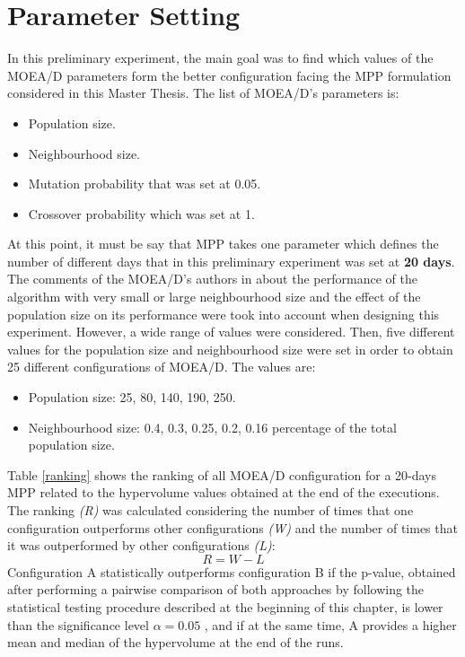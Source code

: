 \section{Parameter Setting}
In this preliminary experiment, the main goal was to find which values of the MOEA/D\cite{Zhang2007} parameters form the better configuration facing the MPP formulation considered in this Master Thesis. The list of MOEA/D's parameters is:
\begin{itemize}
    \item Population size.
    \item Neighbourhood size.
    \item Mutation probability that was set at 0.05.
    \item Crossover probability which was set at 1.
\end{itemize}
At this point, it must be say that MPP takes one parameter which defines the number of different days that in this preliminary experiment was set at \textbf{20 days}. 
The comments of the MOEA/D's authors in \cite{Zhang2007} about the performance of the algorithm with very small or large neighbourhood size and the effect of the population size on its performance were took into account when designing this experiment. However, a wide range of values were considered. Then, five different values for the population size and neighbourhood size were set in order to obtain 25 different configurations of MOEA/D. The values are:
\begin{itemize}
    \item Population size: 25, 80, 140, 190, 250.
    \item Neighbourhood size: 0.4, 0.3, 0.25, 0.2, 0.16 percentage of the total population size.
\end{itemize}
Table \ref{ranking} shows the ranking of all MOEA/D configuration for a 20-days MPP related to the hypervolume values obtained at the end of the executions. The ranking \textit{(R)} was calculated considering the number of times that one configuration outperforms other configurations \textit{(W)} and the number of times that it was outperformed by other configurations \textit{(L)}: 
\[ 
R = W - L
\]
Configuration A statistically outperforms configuration B if the p-value, obtained after performing a pairwise comparison of both approaches by following the statistical testing procedure described at the beginning of this chapter, is lower than the significance level $\alpha = 0.05$ , and if at the same time, A provides a higher mean and median of the hypervolume at the end of the runs\cite{Miranda2018}.

